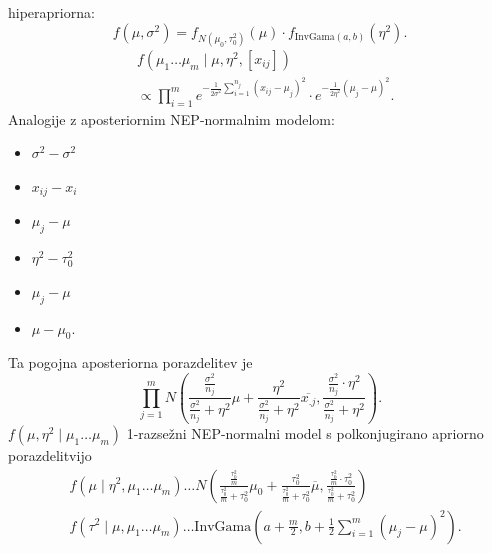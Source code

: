 \documentclass[a4paper, 12pt]{book}
\theoremstyle{definition}
\theoremstyle{remark}
\begin{document}
hiperapriorna:
\begin{equation*}
  f(\mu, \sigma^2) = f_{N(\mu_0, \tau_0^2)}(\mu) \cdot f_{\text{InvGama}(a,b)} (\eta^2).
\end{equation*}
\begin{align*}
  &f(\mu_1 \dots \mu_m \mid \mu, \eta^2, [x_{ij}]) \\
  &\propto \prod_{i=1}^{m} e^{-\frac{1}{2 \sigma^2} \sum_{i=1}^{n_j} (x_{ij} - \mu_j)^2}
   \cdot e^{-\frac{1}{2 \eta^2} (\mu_j - \mu)^2}.
\end{align*}
Analogije z aposteriornim NEP-normalnim modelom:
\begin{itemize}
  \item $\sigma^2 - \sigma^2$
  \item $x_{ij} - x_i$
  \item $\mu_j - \mu$
  \item $\eta^2 - \tau_0^2$
  \item $\mu_j - \mu$
  \item $\mu - \mu_0$.
\end{itemize}
Ta pogojna aposteriorna porazdelitev je
\begin{equation*}
  \prod_{j=1}^{m} N \left( \frac{\frac{\sigma^2}{n_j}}{\frac{\sigma^2}{n_j} + \eta^2} \mu
    + \frac{\eta^2}{\frac{\sigma^2}{n_j} + \eta^2} \overline{x_{.j}},
    \frac{\frac{\sigma^2}{n_j} \cdot \eta^2}{\frac{\sigma^2}{n_j} + \eta^2} \right).
\end{equation*}
$f(\mu, \eta^2 \mid \mu_1 \dots \mu_m)$ 1-razsežni NEP-normalni model s polkonjugirano apriorno porazdelitvijo
\begin{align*}
  &f(\mu \mid \eta^2, \mu_1 \dots \mu_m) \dots
    N \left( \frac{\frac{\tau_0^2}{m}}{\frac{\tau_0^2}{m} + \tau_0^2} \mu_0
    + \frac{\tau_0^2}{\frac{\tau_0^2}{m} + \tau_0^2} \overline{\mu},
    \frac{\frac{\tau_0^2}{m} \cdot \tau_0^2}{\frac{\tau_0^2}{m} + \tau_0^2} \right) \\
  &f(\tau^2 \mid \mu, \mu_1 \dots \mu_m) \dots
    \text{InvGama}\left(a+\frac{m}{2}, b+\frac{1}{2}\sum_{i=1}^{m}(\mu_j-\mu)^2\right).
\end{align*}


\end{document}
